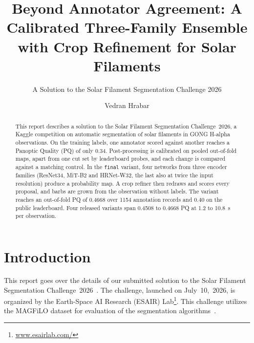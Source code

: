 \documentclass[sigconf,pbalance]{acmart}
\begin{document}
\title[A Calibrated Three-Family Ensemble with Crop Refinement for Solar Filaments]{Beyond Annotator Agreement: A Calibrated Three-Family Ensemble with Crop Refinement for Solar Filaments}
\subtitle{A Solution to the Solar Filament Segmentation Challenge 2026}


\author{Vedran Hrabar}

\begin{abstract}
    This report describes a solution to the Solar Filament Segmentation Challenge~2026, a Kaggle competition on automatic segmentation of solar filaments in GONG H-alpha observations.
    On the training labels, one annotator scored against another reaches a Panoptic Quality (PQ) of only 0.34.
    Post-processing is calibrated on pooled out-of-fold maps, apart from one cut set by leaderboard probes, and each change is compared against a matching control.
    In the \texttt{final} variant, four networks from three encoder families (ResNet34, MiT-B2 and HRNet-W32, the last also at twice the input resolution) produce a probability map.
    A crop refiner then redraws and scores every proposal, and barbs are grown from the observation without labels.
    The variant reaches an out-of-fold PQ of 0.4668 over 1154 annotation records and 0.40 on the public leaderboard.
    Four released variants span 0.4508 to 0.4668 PQ at 1.2 to 10.8~s per observation.
\end{abstract}


\maketitle


\section{Introduction}\label{sec:introduction}
    This report goes over the details of our submitted solution to the Solar Filament Segmentation Challenge~2026~\cite{filament-segmentation-2026}.
    The challenge, launched on July~10,~2026, is organized by the Earth-Space AI Research (ESAIR) Lab\footnote{\href{https://www.esairlab.com/home}{www.esairlab.com/}}.
    This challenge utilizes the MAGFiLO dataset for evaluation of the segmentation algorithms~\cite{ahmadzadeh2024dataset}.
\end{document}
